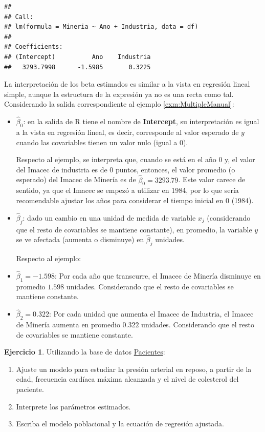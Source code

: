 \documentclass[
  11pt,
]{book}
\providecommand{\tightlist}{%
  \setlength{\itemsep}{0pt}\setlength{\parskip}{0pt}}
\theoremstyle{definition}
\theoremstyle{definition}
\theoremstyle{definition}
\newtheorem{exercise}{Ejercicio}[chapter]
\theoremstyle{definition}
\theoremstyle{remark}
\begin{document}
\begin{verbatim}
## 
## Call:
## lm(formula = Mineria ~ Ano + Industria, data = df)
## 
## Coefficients:
## (Intercept)          Ano    Industria  
##   3293.7998      -1.5985       0.3225
\end{verbatim}

La interpretación de los beta estimados es similar a la vista en regresión lineal simple, aunque la estructura de la expresión ya no es una recta como tal. Considerando la salida correspondiente al ejemplo \ref{exm:MultipleManual}:

\begin{itemize}
\item
  \(\widehat{\beta}_0\): en la salida de R tiene el nombre de \textbf{Intercept}, su interpretación es igual a la vista en regresión lineal, es decir, corresponde al valor esperado de \(y\) cuando las covariables tienen un valor nulo (igual a 0).

  Respecto al ejemplo, se interpreta que, cuando se está en el año 0 y, el valor del Imacec de industria es de 0 puntos, entonces, el valor promedio (o esperado) del Imacec de Minería es de \(\widehat{\beta}_0 = 3293.79\). Este valor carece de sentido, ya que el Imacec se empezó a utilizar en 1984, por lo que sería recomendable ajustar los años para considerar el tiempo inicial en 0 (1984).
\item
  \(\widehat{\beta}_j\): dado un cambio en una unidad de medida de variable \(x_j\) (considerando que el resto de covariables se mantiene constante), en promedio, la variable \(y\) se ve afectada (aumenta o disminuye) en \(\widehat{\beta}_j\) unidades.

  Respecto al ejemplo:
\item
  \(\widehat{\beta}_1 = -1.598\): Por cada año que transcurre, el Imacec de Minería disminuye en promedio \(1.598\) unidades. Considerando que el resto de covariables se mantiene constante.
\item
  \(\widehat{\beta}_2 = 0.322\): Por cada unidad que aumenta el Imacec de Industria, el Imacec de Minería aumenta en promedio \(0.322\) unidades. Considerando que el resto de covariables se mantiene constante.
\end{itemize}

\begin{exercise}

Utilizando la base de datos \hyperref[Pacientes]{Pacientes}:

\begin{enumerate}
\def\labelenumi{\arabic{enumi}.}
\tightlist
\item
  Ajuste un modelo para estudiar la presión arterial en reposo, a partir de la edad, frecuencia cardíaca máxima alcanzada y el nivel de colesterol del paciente.
\item
  Interprete los parámetros estimados.
\item
  Escriba el modelo poblacional y la ecuación de regresión ajustada.
\end{enumerate}

\end{exercise}
\end{document}
